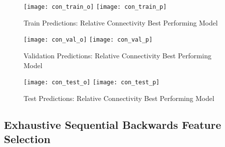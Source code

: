\begin{figure}[H]
\centering
\texttt{[image: con\_train\_o]}
\texttt{[image: con\_train\_p]}
\caption{Train Predictions: Relative Connectivity Best Performing Model}
\label{fig:pred-tra-con}
\end{figure}

\begin{figure}[H]
\centering
\texttt{[image: con\_val\_o]}
\texttt{[image: con\_val\_p]}
\caption{Validation Predictions: Relative Connectivity Best Performing Model}
\label{fig:pred-val-con}
\end{figure}

\begin{figure}[H]
\centering
\texttt{[image: con\_test\_o]}
\texttt{[image: con\_test\_p]}
\caption{Test Predictions: Relative Connectivity Best Performing Model}
\label{fig:pred-tes-con}
\end{figure}

\subsection{Exhaustive Sequential Backwards Feature Selection}
\label{sec:seqback}

